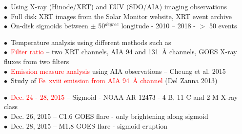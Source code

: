 \documentclass{beamer}
\begin{document}

\begin{frame}
 
 \vspace{-2mm}
 \begin{tcolorbox}[title = \bf Data collection, beforeafter skip=5mm, beforeafter = 10mm, right = 1mm,colframe=blue!50!black]
\scriptsize  $\bullet$~Using X-ray (Hinode/XRT) and EUV (SDO/AIA) imaging observations \\
             $\bullet$~Full disk XRT images from the Solar Monitor website, XRT event archive \\
             $\bullet$~On-disk sigmoids between $\pm$ 50$^{degree}$ longitude - 2010 – 2018 - $>$ 50 events
\end{tcolorbox}

\begin{tcolorbox}[title = \bf Methodology, beforeafter skip=5mm, beforeafter = 10mm, right = 1mm,colframe=blue!50!black]
\scriptsize  $\bullet$~Temperature analysis using different methods such as \\
             $\bullet$~\textcolor{red}{Filter ratio} -- two XRT channels, AIA 94 and 131~{\AA} channels,
GOES X-ray fluxes from two filters \\
             $\bullet$~\textcolor{red}{Emission measure analysis} using AIA observations -- Cheung et al. 2015 \\
             $\bullet$~Study of \textcolor{red}{Fe~{\sc xviii} emission from AIA 94~{\AA} channel} (Del Zanna 2013)
\end{tcolorbox}

\begin{tcolorbox}[title = \textbf{Sigmoid observation}, beforeafter skip=5mm, beforeafter = 10mm, right = 1mm,colframe=blue!50!black]
\scriptsize  $\bullet$~\textcolor{red}{Dec. 24 - 28, 2015} -- Sigmoid - NOAA AR 12473 - 4 B, 11 C and 2 M X-ray class \\
\scriptsize  $\bullet$~Dec. 26, 2015 -- C1.6 GOES flare - only brightening along sigmoid \\
\scriptsize  $\bullet$~Dec. 28, 2015 -- M1.8 GOES flare - sigmoid eruption \\
\end{tcolorbox}

\end{frame}


\end{document}
